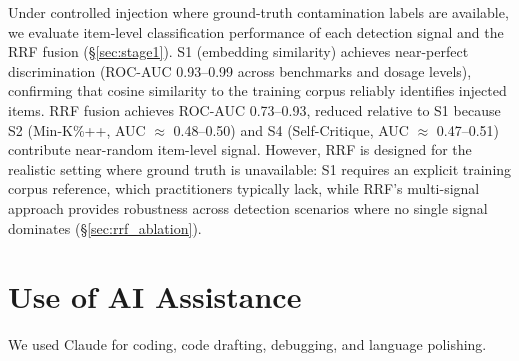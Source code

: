 Under controlled injection where ground-truth contamination labels are available, we evaluate item-level classification performance of each detection signal and the RRF fusion (\S\ref{sec:stage1}). S1 (embedding similarity) achieves near-perfect discrimination (ROC-AUC 0.93--0.99 across benchmarks and dosage levels), confirming that cosine similarity to the training corpus reliably identifies injected items. RRF fusion achieves ROC-AUC 0.73--0.93, reduced relative to S1 because S2 (Min-K\%++, AUC $\approx$ 0.48--0.50) and S4 (Self-Critique, AUC $\approx$ 0.47--0.51) contribute near-random item-level signal. However, RRF is designed for the realistic setting where ground truth is unavailable: S1 requires an explicit training corpus reference, which practitioners typically lack, while RRF's multi-signal approach provides robustness across detection scenarios where no single signal dominates (\S\ref{sec:rrf_ablation}).

\section{Use of AI Assistance}
We used Claude for coding, code drafting, debugging, and language polishing.
